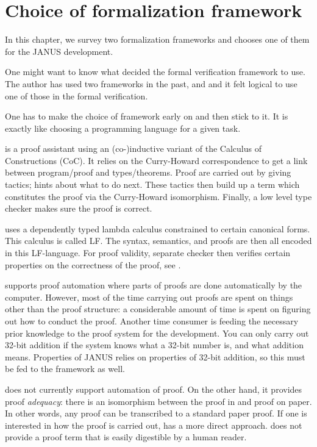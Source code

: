 \chapter{Choice of formalization framework}
\label{chap:thm-prover-choice}

In this chapter, we survey two formalization frameworks and chooses
one of them for the JANUS development.

One might want to know what decided the formal verification framework
to use. The author has used two frameworks in the past, \coq{} and \twelf{}
and it felt logical to use one of those in the formal verification.

One has to make the choice of framework early on and then stick to
it. It is exactly like choosing a programming language for a given
task.

\coq{} is a proof assistant using an (co-)inductive variant of the
Calculus of Constructions (CoC). It relies on the Curry-Howard
correspondence to get a link between program/proof and
types/theorems. Proof are carried out by giving tactics; hints about
what to do next. These tactics then build up a term which constitutes
the proof via the Curry-Howard isomorphism. Finally, a low level type
checker makes sure the proof is correct.

\twelf{} uses a dependently typed lambda calculus constrained to
certain canonical forms. This calculus is called LF. The syntax,
semantics, and proofs are then all encoded in this LF-language. For
proof validity, separate checker then verifies certain properties on
the correctness of the proof, see \cite{harper+05:how-to-believe,
  harper+07:mechanizing}.

\coq{} supports proof automation where parts of proofs are done
automatically by the computer. However, most of the time carrying out
proofs are spent on things other than the proof structure: a
considerable amount of time is spent on figuring out how to conduct
the proof. Another time consumer is feeding the necessary prior
knowledge to the proof system for the development. You can only carry
out 32-bit addition if the system knows what a 32-bit
number is, and what addition means. Properties of JANUS relies on
properties of 32-bit addition, so this must be fed to the framework as
well.

\twelf{} does not currently support automation of proof. On the other
hand, it provides proof \emph{adequacy}: there is an isomorphism
between the proof in \twelf{} and proof on paper. In other words, any
proof can be transcribed to a standard paper proof. If one is
interested in how the proof is carried out, \twelf{} has a more direct
approach. \coq{} does not provide a proof term that is easily
digestible by a human reader.

